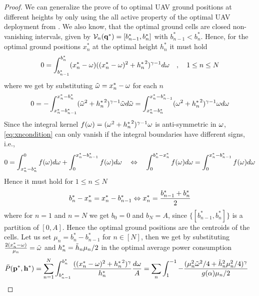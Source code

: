 \documentclass[smallabstract,smallcaptions]{dccpaper}
\newif\ifproof\prooffalse %
\newcommand{\Pbar}{\ensuremath{\bar{P}}}         %
\newcommand{\Vor}{\ensuremath{\mathcal{V}}}         %
\begin{document}
\ifproof
\begin{proof}
  We can generalize the prove of  to optimal UAV ground positions at different heights by only
  using the all active property of the optimal UAV deployment from  . We also know, that the
  optimal ground cells are closed non-vanishing intervals, given by $\Vor_n(\vq^*)=[b_{n-1}^*,b_n^*]$ with
  $b^*_{n-1}<b_n^*$.  Hence, for the optimal ground positions $x_n^*$ at the optimal height $h_n^*$ it must hold 
  \begin{align}
    0 = \int^{b^*_n}_{b_{n-1}^*} (x_n^*-\omega) ((x_n^*-\omega)^2+{h^{*}_n}^2)^{\gamma-1}d\omega \quad,\quad 1\leq n\leq
    N\label{eq:vornx_diffh}
  \end{align}
  where we get by substituting ${  \tilde{\omega} }=x_n^*-\omega$ for each $n$ 
  \begin{align}
    0=-\int_{x_n^*-b^*_{n-1}}^{x^*_n-b^*_{n}} ({  \tilde{\omega} }^2+{h^{*}_n}^2)^{\gamma-1}{  \tilde{\omega} } d{  \tilde{\omega} } 
    =\int_{x_n^*-b^*_{n}}^{x_n^*-b^*_{n-1}} (\omega^2+{h^{*}_n}^2)^{\gamma-1}\omega d\omega\label{eq:xncondition}
  \end{align}
  Since the integral kernel $f(\omega)=(\omega^2+{h^{*}_n}^2)^{\gamma-1}\omega$ is  anti-symmetric in $\omega$,
  \eqref{eq:xncondition} can only vanish if the integral boundaries have different signs, i.e.,
  \begin{align}
    0= \int_{x_n^*-b_{n}^*}^0 f(\omega)d\omega + \int_0^{x_n^*-b_{n-1}^*} f(\omega)d\omega 
    \quad    \Leftrightarrow \quad
        \int_0^{b^*_n-x_n^*} f(\omega)d\omega = \int_0^{x_n^*-b^*_{n-1}}f(\omega)d\omega 
        \notag
  \end{align}
  Hence it must hold  for $1\leq n\leq N$
  \begin{align}
    b^*_{n} -{x^{*}_n}={x^{*}_n}-b^*_{n-1} \Leftrightarrow  {\ensuremath{x^{*}}_n}=\frac{b_{n-1}^*+b_{n}^*}{2}\label{eq:bnoptimal}
  \end{align}
  where for $n=1$ and $n=N$ we get $b_0=0$ and $b_N=A$, since $\{[b^*_{n-1},b_n^*]\}$ is a partition of $[0,A]$. Hence
  the optimal ground positions are the centroids of the cells.  Let us set $\mu_n=b_n^*-b_{n-1}^*$ for $n\in[N]$, then
  we get by substituting $\frac{2(x_n^*-\omega)}{\mu_n}={  \tilde{\omega} }$ and $h^{*}_n=\tilde{h}_n\mu_n/2$  in the optimal average power
  consumption
  \begin{align}
    \Pbar(\vp^*,\vh^*)&=\sum_{n=1}^N \int_{b_{n-1}^*}^{b_n^*} \frac{ ((\pGlob_n-\ome)^2+{\hGlob_n}^2)^{\gam}}{\hGlob_n}\frac{d\ome}{A} 
    = \sum_n \int_{1}^{-1} -\frac{  (\mu_n^2 \tome^2/4 + \tilde{h}_n^2\mu_n^2/4)^{\gam}}{g(\alp)\mu_n/2}

\end{align}
\end{proof}
\end{document}
